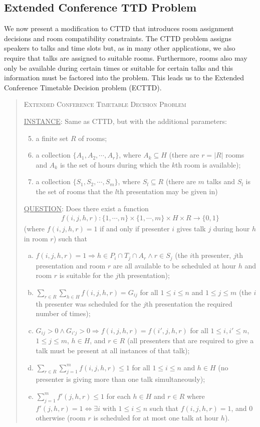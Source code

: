 \documentclass{svjour3}                     %
\begin{document}
\subsection{Extended Conference TTD Problem}
We now present a modification to CTTD that introduces room assignment decisions and room compatibility constraints.
The CTTD problem assigns speakers to talks and time slots but, as in many other applications, we also require that talks are assigned to suitable rooms.
Furthermore, rooms also may only be available during certain times or suitable for certain talks and this information must be factored into the problem. 
This leads us to the Extended Conference Timetable Decision problem (ECTTD).
\begin{quote}
	\textsc{Extended Conference Timetable Decision Problem}
	
	\underline{INSTANCE}: Same as CTTD, but with the additional parameters:
	\begin{enumerate}[1.]
		\setcounter{enumi}{4}
		\item a finite set $R$ of rooms;
		\item a collection $\{A_1,A_2,\cdots,A_r\}$, where $A_k \subseteq H$ (there are $r=|R|$ rooms and $A_k$ is the set of hours during which the $k$th room is available);
		\item a collection $\{S_1,S_2,\cdots,S_m\}$, where $S_l \subseteq R$ (there are $m$ talks and $S_l$ is the set of rooms that the $l$th presentation may be given in)
	\end{enumerate}
	\underline{QUESTION}: Does there exist a function 
	\begin{gather*}
		f(i,j,h,r) : \{1,\cdots,n\} \times \{1,\cdots,m\} \times H \times R \rightarrow \{0,1\}
	\end{gather*}
	(where $f(i,j,h,r)=1$ if and only if presenter $i$ gives talk $j$ during hour $h$ in room $r$) such that
	\begin{enumerate}[(a)]
		\item $f(i,j,h,r) = 1 \Rightarrow h \in P_i \cap T_j \cap A_r \land r \in S_j$ (the $i$th presenter, $j$th presentation and room $r$ are all available to be scheduled at hour $h$ and room $r$ is suitable for the $j$th presentation);
		\item $\sum\limits_{r \in R}\sum\limits_{h \in H} f(i,j,h,r) = G_{ij}$ for all $1 \le i \le n$ and $1 \le j \le m$ (the $i$th presenter was scheduled for the $j$th presentation the required number of times);
		\item $G_{ij} > 0 \land G_{i'j} > 0 \Rightarrow f(i,j,h,r)=f(i',j,h,r)$ for all $1 \le i,i' \le n$, $1 \le j \le m$, $h \in H$, and $r \in R$ (all presenters that are required to give a talk must be present at all instances of that talk);
		\item $\sum\limits_{r \in R}\sum\limits_{j=1}^m f(i,j,h,r) \le 1$ for all $1 \le i \le n$ and $h \in H$ (no presenter is giving more than one talk simultaneously);
		\item $\sum\limits_{j=1}^m f'(j,h,r) \le 1$ for each $h \in H$ and $r \in R$ where $f'(j,h,r) = 1 \iff \exists i \text{ with } 1 \le i \le n$ such that $f(i,j,h,r)=1$, and 0 otherwise (room $r$ is scheduled for at most one talk at hour $h$).
	\end{enumerate}
\end{quote}
\end{document}
